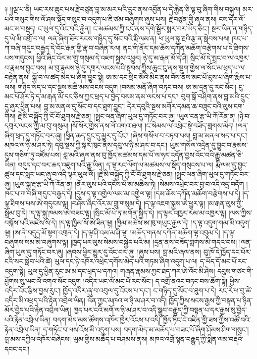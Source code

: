 \documentclass{article}
\begin{document}
༈ །།ལྔ་པ་ནི། ཡང་རས་ཆུང་པས་རྗེ་བཙུན་བླ་མ་མར་པའི་དྲུང་ནས་འབྱོན་པ་དེ་རྐྱེན་ཅི་ལྟ་བུ་ཞིག་གིས་བསྐུལ། མར་པའི་གསུང་གིས་ལོ་ཤས་སྡོད་གསུང་བ་འདུག་པ་ཇི་ཙམ་བཞུགས་ཞུས་པས། རྗེ་བཙུན་གྱི་ཞལ་ནས། ངས་དེར་ལོ་མང་མ་བསྡད། ང་ཡུལ་དུ་འོང་བའི་རྐྱེན། ང་མཚམས་ཀྱི་ངང་ནས་དགེ་སྦྱོར་སྨར་བར་ཡོད་ཅིང་། སྔར་ཡིན་ན་གཉིད་དུ་ཡེ་མི་འགྲོ་བ་ལ། ལན་ཞིག་ཐོར་རངས་གཉིད་དུ་སོང་བའི་རྨི་ལམ་ན། ཕ་ཡུལ་སྐྱ་རྔའི་རྩ་ན་སླེབས་པས། ཁང་པ་ཀ་བཞི་གདུང་བརྒྱད་དེ་བོང་རྒན་གྱི་རྣ་བ་བཞིན་རལ། ནང་གི་ནོར་དམ་ཆོས་དཀོན་མཆོག་བརྩེགས་པ་དེ་ཐིགས་པས་གདུངས། ཕྱིའི་ཞིང་འོར་མ་གྲུ་གསུམ་དེ་འཇག་སྐྱས་འཕྱུར། ཉེ་དུ་མ་རྒན་མོ་དེ་ཤི། སྲིང་མོ་དེ་སྤྲང་བ་ལ་འཁྱར་བ་རྣམས་བྱུང་བས། མ་བུ་རྣམས་ཉེ་དུ་དགྲར་ལངས་པའི་སྟབས་ཀྱིས་ཆུང་ངུ་ནས་སྡུག་གྱེས་ལ་སོང་མ་ཕྲད་པ་ལ་བརྟེན་ནས། སྐྱོ་བ་ལ་ཚད་མེད་པ་ཞིག་བྱུང་སྟེ། ཨ་མ་དང་སྲིང་མོའི་མིང་ནས་བོས་ནས་མང་པོ་ངུས་པ་ཞིག་རྨིས་པ་ལས། གཉིད་སད་པ་དང་སྔས་མཆི་མས་བངས་འདུག །བསམ་མནོ་ཞིག་བཏང་བས། ཨ་མ་དྲན་དུ་རང་སོང་། ངུ་མང་པོ་ཤོར་ཏེ་ད་མ་རྒན་མོ་དང་ཅིས་ཀྱང་ཕྲད་པ་བྱེད་བསམ་ནམ་ལངས་པ་དང་། བུག་སྒོ་བཤིག་ནས་བླ་མའི་དྲུང་དུ་ཞུར་ཕྱིན་པས། བླ་མ་མནལ་དུ་སོང་བ་དང་ཐུག་བྱུང་། དེར་དབུའི་སྔས་མགོར་དམན་ཆ་བཟུང་བའི་ལུས་ངག་གིས། རྗེ་མི་བསྐྱོད་ཀྱི་ངོ་བོ་ཐུགས་རྗེ་ཅན། །སྤྲང་ལན་ཞིག་ཡུལ་དུ་གཏོང་བར་ཞུ། །ཡུལ་ངན་རྩ་ཡི་ཀོ་རོན་ན། །ཉེ་བ་དགྲར་ལངས་ཀྱི་མ་བུ་གསུམ། །སོ་སོར་གྱེས་ནས་ལོ་འགའ་ཐལ། །ང་སེམས་ལ་འཕྲེང་སྟེ་བཟོད་གླགས་མེད། །ལན་ཞིག་ཕྲད་དུ་གཏོང་བར་ཞུ། །ཕྱིན་ཆད་དྲུང་དུ་མྱུར་དུ་འོང་། །ཞེས་གསོལ་བ་བཏབ་པས། བླ་མ་མནལ་སད་པ་དང་། མཁའ་ལ་ཉི་མ་ཤར་ཏེ། དབུ་སྔས་ཀྱི་སྐར་ཁུང་ནས་དབུ་ལ་ཉི་མ་ཤར་བ་དང་། ཡུམ་གསོལ་འདྲེན་དུ་བྱུང་བ་རྣམས་དུས་གཅིག་ཏུ་འཛོམ་པས། བླ་མའི་ཞལ་ནས་བུ་ཁྱོད་མཚམས་དམ་པོ་ལ་ཧར་འདོན་བྱས་འོང་བའི་རྒྱུ་མཚན་ཅི་ཡིན། བདུད་དང་བར་ཆད་འཇུག་པའི་རྒྱུ་ཡིན། ད་ལྟ་རང་ལོག་ལ་མཚམས་ལ་སྡོད་གསུངས་པ་ལ། རྨི་ལམ་དུ་བྱུང་ཚུལ་དང་སླར་ཡང་ཞུ་བ་འདི་ལྟར་ཕུལ་ལོ། །རྗེ་མི་བསྐྱོད་ཀྱི་ངོ་བོ་ཐུགས་རྗེ་ཅན། །སྤྲང་ལན་ཞིག་ཡུལ་དུ་གཏོང་བར་ཞུ། །ཡུལ་སྐྱ་རྔ་རྩ་ཡི་ཀོ་རོན་ན། །ནོར་ལུས་པའི་དངོས་པོ་མ་མཆིས་ཏེ། །སེམས་འཕྲེང་བར་བྱ་བ་འདི་འདྲ་བདོག །ཁང་པ་ཀ་བཞི་གདུང་བརྒྱད་དེ། །དུས་ད་ལྟ་འགྱེལ་ལམ་མ་འགྱེལ་ལྟ། །དམ་ཆོས་དཀོན་མཆོག་བརྩེགས་པ་དེ། །ད་ལྟ་ཐིགས་པས་ཨེ་གདུངས་ལྟ། །བཤོས་ཞིང་འོར་མ་གྲུ་གསུམ་དེ། །ད་ལྟ་འཇག་སྐྱས་ཨེ་ཕྱུར་ལྟ། །མ་རྒན་ལུས་ཀྱི་སྦྲོམ་བུ་དེ། །ད་ལྟ་སྐུ་ཁམས་ཨེ་བཟང་ལྟ། །སྲིང་མོ་པེ་ཏ་མགོན་སྐྱིད་དེ། །ད་ལྟར་འཁྱར་རམ་མ་འཁྱར་ལྟ། །ལས་ཀྱིས་བསྐོས་པའི་མཛེས་སེ་དེ། །ད་ལྟ་ཁྱིམ་སོ་ཨེ་ཟིན་ལྟ། །ཁྱིམ་མཚེས་ཨ་ཁུ་གཡུང་རྒྱལ་དེ། །ད་ལྟ་འདུག་གམ་མི་འདུག་ལྟ། །ཨ་ནེ་བདུད་མོ་སྟག་འགྲན་དེ། །ད་ལྟ་ཤི་འམ་མ་ཤི་ལྟ། །མཆོད་གནས་དཀོན་མཆོག་ལྷ་འབུམ་དེ། །ད་ལྟ་བཞུགས་སམ་མི་བཞུགས་ལྟ། །ཁྱད་པར་ལུས་སེམས་བསྐྱེད་པའི་མ། །དྲན་ནས་བཟོད་གླགས་མི་གདའ་བས། །ལན་ཞིག་ཡུལ་དུ་གཏོང་བར་ཞུ། །ཞབས་ཕྱིར་མྱུར་དུ་འོང་བར་ཞུ། །ཞུས་པས། བླ་མའི་ཞལ་ནས། བུ་ཁོ་དེ་ཁྱོད་དང་པོར་ངའི་སར་སླེབ་པའི་ཚེ། ཡུལ་དང་ཉེ་འཁོར་འཕྲེང་དགོས་མེད་པའི་གཏམ་ཞིག་འདུག་པ་ལ། ད་ཡོད་དོ་མང་པོ་རང་འདུག་སྟེ། ཡུལ་དུ་ཕྱིན་རུང་ཨ་མ་དང་ཕྲད་པ་དཀའ། གཞན་རྣམས་ཀྱང་ཐད་ཀར་ཨེ་འོང་མི་ཤེས། དབུས་གཙང་གི་ཕྱོགས་སུ་ཡང་ལོ་འགའ་སོང་འདུག །འདིར་ཡང་ལོ་མང་པོ་རང་སོང་། ད་འགྲོ་ནའང་བཏང་བས་ཆོག་སྟེ། ཕྱིས་འདིར་འོང་རྩིས་བྱས་རུང་། ཁྱོད་འདིར་ཞུ་བ་འབུལ་དུ་འོངས་པ་དང་། ང་གཉིད་དུ་སོང་བ་ཐུག་པ་དེ། རང་རེ་ཕ་བུ་ཚེ་འདིར་མི་འཕྲད་པའི་རྟེན་འབྲེལ་ཡིན། འོན་ཀྱང་མཁའ་ལ་ཉི་མ་ཤར་བ་འདི། ཁྱོད་ཀྱིས་སངས་རྒྱས་ཀྱི་བསྟན་པ་ཉིན་མོར་བྱེད་པའི་རྟེན་འབྲེལ་ཡིན། ཁྱད་པར་ངའི་མགོ་ལ་ཉི་མ་ཤར་བ་འདི་སྒྲུབ་བརྒྱུད་ཀྱི་བསྟན་པ་དར་རྒྱས་སུ་བྱེད་པའི་རྟེན་འབྲེལ་ཡིན། བདག་མེད་མས་ཚོགས་འཁོར་ཁྱེར་འོངས་པ་འདི། ཁྱོད་ཏིང་ངེ་འཛིན་གྱི་ཟས་ཀྱིས་འཚོ་བའི་རྟེན་འབྲེལ་ཡིན། ད་གཏོང་བ་ལས་འོས་མི་འདུག་པས། བདག་མེད་མ་མཆོད་པ་བཟང་པོ་ཞིག་ཤོམས་ཤིག་གསུང་། བླ་མས་དཀྱིལ་འཁོར་བཞེངས། ཡུམ་གྱིས་མཆོད་པ་བཤམས་ནས། མཁའ་འགྲོ་སྙན་བརྒྱུད་ཀྱི་སྨིན་ལམ་བརྡའི་དབང་དང་། 
\end{document}
